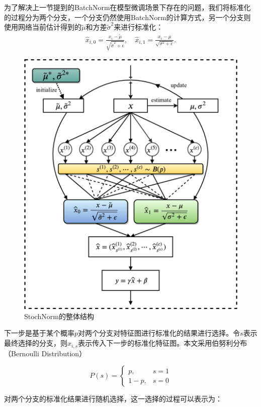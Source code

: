 为了解决上一节提到的BatchNorm在模型微调场景下存在的问题，我们将标准化的过程分为两个分支，一个分支仍然使用BatchNorm的计算方式，另一个分支则使用网络当前估计得到的$\tilde{\mu}$和方差$\tilde{\sigma}^2$来进行标准化：
\begin{equation}
  \label{equal-sn_mean&var}
  \begin{aligned}
    \widehat{x}_{i,0}=\frac{x_{i}-\tilde{\mu}}{\sqrt{\tilde{\sigma}^{2}+\epsilon}},\quad
    \widehat{x}_{i,1}=\frac{x_{i}-\mu}{\sqrt{\sigma^{2}+\epsilon}}.
  \end{aligned}
\end{equation}

\begin{figure}
  \centering
  \includegraphics[width=0.7\linewidth]{figures/arch.png}
  \caption{StochNorm的整体结构}
  \label{fig:arch}
\end{figure}

下一步是基于某个概率$p$对两个分支对特征图进行标准化的结果进行选择。令$s$表示最终选择的分支，则$x_{i,s}$表示传入下一步的标准化特征图。本文采用伯努利分布（Bernoulli Distribution）

\begin{equation}
  P(s)=\left\{
  \begin{matrix}
    p, & s=1\\ 
    1-p,  & s=0
  \end{matrix}
  \right.
\end{equation}

对两个分支的标准化结果进行随机选择，这一选择的过程可以表示为：

